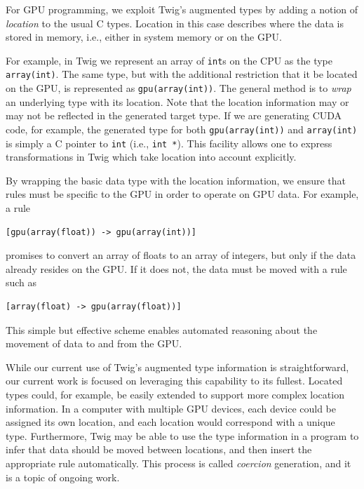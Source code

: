 
For GPU programming, we exploit Twig's augmented types by adding a notion of
\emph{location} to the usual C types. Location in this case describes where the
data is stored in memory, i.e., either in system memory or on the GPU.

For example, in Twig we represent an array of \texttt{int}s on the CPU as the
type \texttt{array(int)}. The same type, but with the additional restriction
that it be located on the GPU, is represented as \texttt{gpu(array(int))}. The
general method is to \emph{wrap} an underlying type with its location. Note that
the location information may or may not be reflected in the generated target
type. If we are generating CUDA code, for example, the generated type for both
\texttt{gpu(array(int))} and \texttt{array(int)} is simply a C pointer to
\texttt{int} (i.e., \texttt{int *}). This facility allows one to express
transformations in Twig which take location into account explicitly.

By wrapping the basic data type with the location information, we ensure that
rules must be specific to the GPU in order to operate on GPU data. For example,
a rule

\begin{verbatim}
[gpu(array(float)) -> gpu(array(int))]
\end{verbatim}

promises to convert an array of floats to an array of integers, but only if the
data already resides on the GPU. If it does not, the data must be moved with a
rule such as

\begin{verbatim}
[array(float) -> gpu(array(float))]
\end{verbatim}

This simple but effective scheme enables automated reasoning about the movement
of data to and from the GPU.

While our current use of Twig's augmented type information is straightforward,
our current work is focused on leveraging this capability to its fullest.
Located types could, for example, be easily extended to support more complex
location information. In a computer with multiple GPU devices, each device could
be assigned its own location, and each location would correspond with a unique
type. Furthermore, Twig may be able to use the type information in a program to
infer that data should be moved between locations, and then insert the
appropriate rule automatically. This process is called \emph{coercion}
generation, and it is a topic of ongoing work.
